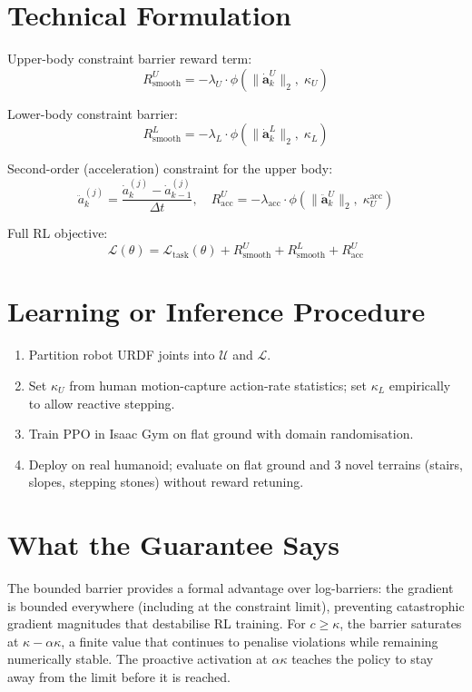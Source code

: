 \documentclass[10pt,twocolumn]{article}
\begin{document}
\section{Technical Formulation}

Upper-body constraint barrier reward term:
\[
R_{\mathrm{smooth}}^U
= -\lambda_U\cdot\phi\!\left(\|\dot{\mathbf{a}}_k^U\|_2,\;\kappa_U\right)
\]

Lower-body constraint barrier:
\[
R_{\mathrm{smooth}}^L
= -\lambda_L\cdot\phi\!\left(\|\dot{\mathbf{a}}_k^L\|_2,\;\kappa_L\right)
\]

Second-order (acceleration) constraint for the upper body:
\[
\ddot{a}_k^{(j)} = \frac{\dot{a}_k^{(j)} - \dot{a}_{k-1}^{(j)}}{\Delta t},
\quad
R_{\mathrm{acc}}^U
= -\lambda_{\mathrm{acc}}\cdot\phi\!\left(
  \|\ddot{\mathbf{a}}_k^U\|_2,\;\kappa_U^{\mathrm{acc}}\right)
\]

Full RL objective:
\[
\mathcal{L}(\theta) = \mathcal{L}_{\mathrm{task}}(\theta)
  + R_{\mathrm{smooth}}^U + R_{\mathrm{smooth}}^L + R_{\mathrm{acc}}^U
\]

\section{Learning or Inference Procedure}

\begin{enumerate}[itemsep=2pt,parsep=0pt]
  \item Partition robot URDF joints into $\mathcal{U}$ and $\mathcal{L}$.
  \item Set $\kappa_U$ from human motion-capture action-rate statistics;
    set $\kappa_L$ empirically to allow reactive stepping.
  \item Train PPO in Isaac Gym on flat ground with domain randomisation.
  \item Deploy on real humanoid; evaluate on flat ground and 3 novel
    terrains (stairs, slopes, stepping stones) without reward retuning.
\end{enumerate}

\section{What the Guarantee Says}

The bounded barrier provides a formal advantage over log-barriers: the
gradient is bounded everywhere (including at the constraint limit),
preventing catastrophic gradient magnitudes that destabilise RL training.
For $c \ge \kappa$, the barrier saturates at $\kappa - \alpha\kappa$, a
finite value that continues to penalise violations while remaining numerically
stable. The proactive activation at $\alpha\kappa$ teaches the policy to
stay away from the limit before it is reached.
\end{document}
